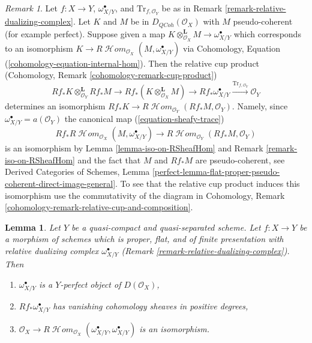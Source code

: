 \documentclass{stacks-project}
\theoremstyle{plain}
\newtheorem{lemma}[subsection]{Lemma}
\theoremstyle{definition}
\theoremstyle{remark}
\newtheorem{remark}[subsection]{Remark}
\numberwithin{equation}{subsection}
\def\SheafHom{\mathop{\mathcal{H}\!\mathit{om}}\nolimits}
\def\QCoh{\mathit{QCoh}}
\begin{document}
\begin{remark}
\label{remark-relative-dualizing-complex-relative-cup-product}
Let $f : X \to Y$, $\omega^\bullet_{X/Y}$, and $\text{Tr}_{f, \mathcal{O}_Y}$
be as in Remark \ref{remark-relative-dualizing-complex}.
Let $K$ and $M$ be in $D_\QCoh(\mathcal{O}_X)$ with
$M$ pseudo-coherent (for example perfect). Suppose given a map
$K \otimes_{\mathcal{O}_X}^\mathbf{L} M \to \omega^\bullet_{X/Y}$
which corresponds to an isomorphism
$K \to R\SheafHom_{\mathcal{O}_X}(M, \omega^\bullet_{X/Y})$
via Cohomology, Equation (\ref{cohomology-equation-internal-hom}).
Then the relative cup product
(Cohomology, Remark \ref{cohomology-remark-cup-product})
$$
Rf_*K \otimes_{\mathcal{O}_Y}^\mathbf{L} Rf_*M
\to
Rf_*(K \otimes_{\mathcal{O}_X}^\mathbf{L} M)
\to
Rf_*\omega^\bullet_{X/Y}
\xrightarrow{\text{Tr}_{f, \mathcal{O}_Y}}
\mathcal{O}_Y
$$
determines an isomorphism
$Rf_*K \to R\SheafHom_{\mathcal{O}_Y}(Rf_*M, \mathcal{O}_Y)$.
Namely, since $\omega^\bullet_{X/Y} = a(\mathcal{O}_Y)$
the canonical map (\ref{equation-sheafy-trace})
$$
Rf_*R\SheafHom_{\mathcal{O}_X}(M, \omega^\bullet_{X/Y}) \to
R\SheafHom_{\mathcal{O}_Y}(Rf_*M, \mathcal{O}_Y)
$$
is an isomorphism by
Lemma \ref{lemma-iso-on-RSheafHom} and
Remark \ref{remark-iso-on-RSheafHom}
and the fact that $M$ and $Rf_*M$ are pseudo-coherent, see
Derived Categories of Schemes, Lemma
\ref{perfect-lemma-flat-proper-pseudo-coherent-direct-image-general}.
To see that the relative cup product
induces this isomorphism use the commutativity of the diagram in
Cohomology, Remark \ref{cohomology-remark-relative-cup-and-composition}.
\end{remark}

\begin{lemma}
\label{lemma-properties-relative-dualizing}
Let $Y$ be a quasi-compact and quasi-separated scheme.
Let $f : X \to Y$ be a morphism of schemes which is
proper, flat, and of finite presentation with
relative dualizing complex $\omega_{X/Y}^\bullet$
(Remark \ref{remark-relative-dualizing-complex}).
Then
\begin{enumerate}
\item $\omega_{X/Y}^\bullet$ is a $Y$-perfect object of $D(\mathcal{O}_X)$,
\item $Rf_*\omega_{X/Y}^\bullet$ has vanishing cohomology sheaves
in positive degrees,
\item $\mathcal{O}_X \to
R\SheafHom_{\mathcal{O}_X}(\omega_{X/Y}^\bullet, \omega_{X/Y}^\bullet)$
is an isomorphism.
\end{enumerate}
\end{lemma}
\end{document}
